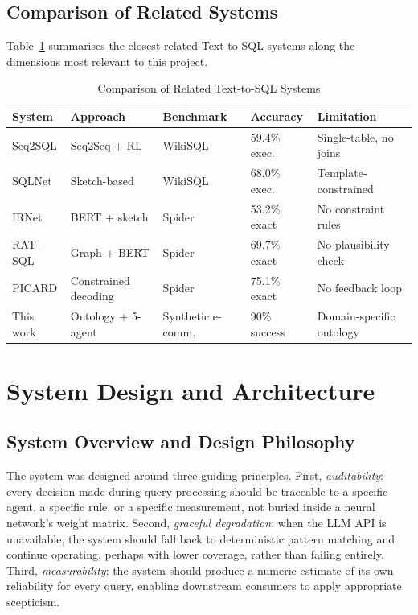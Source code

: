 \documentclass[12pt,a4paper]{report}
\begin{document}
\section{Comparison of Related Systems}
\label{sec:related-comparison}

Table~\ref{tab:related-work} summarises the closest related Text-to-SQL systems along the dimensions most relevant to this project.

\begin{table}[H]
  \centering
  \caption{Comparison of Related Text-to-SQL Systems}
  \label{tab:related-work}
  \renewcommand{\arraystretch}{1.3}
  \begin{tabularx}{\textwidth}{@{}lXXXX@{}}
    \toprule
    \textbf{System} & \textbf{Approach} & \textbf{Benchmark} & \textbf{Accuracy} & \textbf{Limitation} \\
    \midrule
    Seq2SQL \cite{seq2sql} & Seq2Seq + RL & WikiSQL & 59.4\% exec. & Single-table, no joins \\
    SQLNet \cite{sqlnet}   & Sketch-based & WikiSQL & 68.0\% exec. & Template-constrained \\
    IRNet   & BERT + sketch & Spider  & 53.2\% exact & No constraint rules \\
    RAT-SQL & Graph + BERT  & Spider  & 69.7\% exact & No plausibility check \\
    PICARD  & Constrained decoding & Spider & 75.1\% exact & No feedback loop \\
    This work & Ontology + 5-agent & Synthetic e-comm. & 90\% success & Domain-specific ontology \\
    \bottomrule
  \end{tabularx}
\end{table}

\chapter{System Design and Architecture}
\label{ch:design}

\section{System Overview and Design Philosophy}
\label{sec:design-overview}

The system was designed around three guiding principles. First, \textit{auditability}: every decision made during query processing should be traceable to a specific agent, a specific rule, or a specific measurement, not buried inside a neural network's weight matrix. Second, \textit{graceful degradation}: when the \ac{LLM} \ac{API} is unavailable, the system should fall back to deterministic pattern matching and continue operating, perhaps with lower coverage, rather than failing entirely. Third, \textit{measurability}: the system should produce a numeric estimate of its own reliability for every query, enabling downstream consumers to apply appropriate scepticism.
\end{document}
